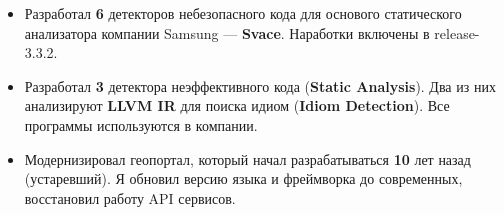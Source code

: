 \documentclass[10pt,a4paper,ragged2e,withhyper]{custom-altacv}
\begin{document}


\makecvheader



\begin{paracol}{2}


\begin{itemize}
	\item Разработал \textbf{6} детекторов небезопасного кода для основого статического анализатора компании Samsung --- \textbf{Svace}. Наработки включены в release-3.3.2.
\end{itemize}

\divider


\begin{itemize}
	\item Разработал \textbf{3} детектора неэффективного кода (\textbf{Static Analysis}). Два из них анализируют \textbf{LLVM IR} для поиска идиом (\textbf{Idiom Detection}). Все программы используются в компании.
\end{itemize}

\divider


\begin{itemize}
	\item Модернизировал геопортал, который начал разрабатываться \textbf{10} лет назад (устаревший). Я обновил версию языка и фреймворка до современных, восстановил работу API сервисов.
\end{itemize}




\end{paracol}
\end{document}
